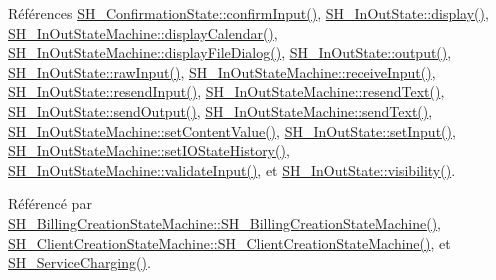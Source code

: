 Références \hyperlink{classSH__ConfirmationState_ae47d89a7fc0ada8eb51d8bef2317b348}{S\-H\-\_\-\-Confirmation\-State\-::confirm\-Input()}, \hyperlink{classSH__InOutState_a918e8a7f5fe00dc16004e46eeee1281d}{S\-H\-\_\-\-In\-Out\-State\-::display()}, \hyperlink{classSH__InOutStateMachine_a0d241868828cbf9798233a8c74c69851}{S\-H\-\_\-\-In\-Out\-State\-Machine\-::display\-Calendar()}, \hyperlink{classSH__InOutStateMachine_aeddfbc098f5ee8ac05eadbaf37803fb1}{S\-H\-\_\-\-In\-Out\-State\-Machine\-::display\-File\-Dialog()}, \hyperlink{classSH__InOutState_a1a2fd4f34484125058e20730aaee7e46}{S\-H\-\_\-\-In\-Out\-State\-::output()}, \hyperlink{classSH__InOutState_a4b1ca094de91c47690ec2d1e95678273}{S\-H\-\_\-\-In\-Out\-State\-::raw\-Input()}, \hyperlink{classSH__InOutStateMachine_ab224e4a6ab99c15770bc63e1b8fdb771}{S\-H\-\_\-\-In\-Out\-State\-Machine\-::receive\-Input()}, \hyperlink{classSH__InOutState_afa791181eb61a18d4337a04827f9b200}{S\-H\-\_\-\-In\-Out\-State\-::resend\-Input()}, \hyperlink{classSH__InOutStateMachine_a526822c66b46aa0cd81ba4473fa5573f}{S\-H\-\_\-\-In\-Out\-State\-Machine\-::resend\-Text()}, \hyperlink{classSH__InOutState_ad40e929a5537eb1d4883d5aa6eee5b15}{S\-H\-\_\-\-In\-Out\-State\-::send\-Output()}, \hyperlink{classSH__InOutStateMachine_ae2cbbe3cd207158668dcb4838938c7ad}{S\-H\-\_\-\-In\-Out\-State\-Machine\-::send\-Text()}, \hyperlink{classSH__InOutStateMachine_aa2766b7a7ba39c35a10df7fc0c151b4f}{S\-H\-\_\-\-In\-Out\-State\-Machine\-::set\-Content\-Value()}, \hyperlink{classSH__InOutState_a0206ab7d5616f28b0da7bfd5451614e8}{S\-H\-\_\-\-In\-Out\-State\-::set\-Input()}, \hyperlink{classSH__InOutStateMachine_a4b72e6da839782a211692a4d728c3925}{S\-H\-\_\-\-In\-Out\-State\-Machine\-::set\-I\-O\-State\-History()}, \hyperlink{classSH__InOutStateMachine_a5a5804bd32a04d25926f6e323b906887}{S\-H\-\_\-\-In\-Out\-State\-Machine\-::validate\-Input()}, et \hyperlink{classSH__InOutState_a8c496b2fe21a51a587c6e4409c0f37ec}{S\-H\-\_\-\-In\-Out\-State\-::visibility()}.



Référencé par \hyperlink{classSH__BillingCreationStateMachine_ad62b77fa4aeafe200056ff3974562f83}{S\-H\-\_\-\-Billing\-Creation\-State\-Machine\-::\-S\-H\-\_\-\-Billing\-Creation\-State\-Machine()}, \hyperlink{classSH__ClientCreationStateMachine_a0b406b0f404c0fd33bf35be8ce0cc811}{S\-H\-\_\-\-Client\-Creation\-State\-Machine\-::\-S\-H\-\_\-\-Client\-Creation\-State\-Machine()}, et \hyperlink{classSH__ServiceCharging_afa5273d046049b1c2b020a6a19a8290b}{S\-H\-\_\-\-Service\-Charging()}.


